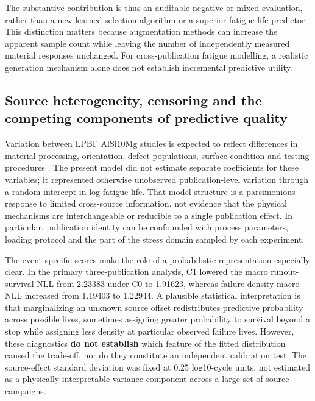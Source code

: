 \documentclass[12pt,a4paper]{article}
\begin{document}
The substantive contribution is thus an auditable negative-or-mixed evaluation, rather than a new learned selection algorithm or a superior fatigue-life predictor. This distinction matters because augmentation methods can increase the apparent sample count while leaving the number of independently measured material responses unchanged. For cross-publication fatigue modelling, a realistic generation mechanism alone does not establish incremental predictive utility.

\subsection{Source heterogeneity, censoring and the competing components of predictive quality}

Variation between LPBF AlSi10Mg studies is expected to reflect differences in material processing, orientation, defect populations, surface condition and testing procedures \cite{wu2021,vanderrest2025}. The present model did not estimate separate coefficients for these variables; it represented otherwise unobserved publication-level variation through a random intercept in log fatigue life. That model structure is a parsimonious response to limited cross-source information, not evidence that the physical mechanisms are interchangeable or reducible to a single publication effect. In particular, publication identity can be confounded with process parameters, loading protocol and the part of the stress domain sampled by each experiment.

The event-specific scores make the role of a probabilistic representation especially clear. In the primary three-publication analysis, C1 lowered the macro runout-survival NLL from 2.23383 under C0 to 1.91623, whereas failure-density macro NLL increased from 1.19403 to 1.22944. A plausible statistical interpretation is that marginalizing an unknown source offset redistributes predictive probability across possible lives, sometimes assigning greater probability to survival beyond a stop while assigning less density at particular observed failure lives. However, these diagnostics \textbf{do not establish} which feature of the fitted distribution caused the trade-off, nor do they constitute an independent calibration test. The source-effect standard deviation was fixed at 0.25 log10-cycle units, not estimated as a physically interpretable variance component across a large set of source campaigns.
\end{document}
